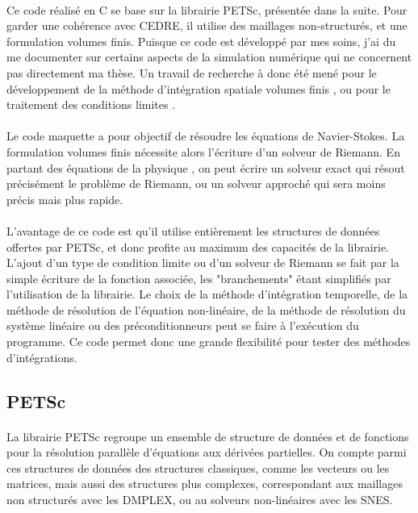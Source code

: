     \paragraph{}
    Ce code réalisé en C se base sur la librairie PETSc, présentée dans la suite.
    Pour garder une cohérence avec CEDRE, il utilise des maillages non-structurés, et une formulation volumes finis.
    Puisque ce code est développé par mes soins, j'ai du me documenter sur certains aspects de la simulation numérique qui ne concernent pas directement ma thèse.
    Un travail de recherche à donc été mené pour le développement de la méthode d'intégration spatiale volumes finis \cite{EymardGallouetHerbin2000}, ou pour le traitement des conditions limites \cite{PoinsotLele1992}.

    \paragraph{}
    Le code maquette a pour objectif de résoudre les équations de Navier-Stokes.
    La formulation volumes finis nécessite alors l'écriture d'un solveur de Riemann.
    En partant des équations de la physique \cite{Masatsuka2013}, on peut écrire un solveur exact \cite{GottliebGroth1988} qui résout précisément le problème de Riemann, ou un solveur approché \cite{Roe1981} qui sera moins précis mais plus rapide.

    \paragraph{}
    L'avantage de ce code est qu'il utilise entièrement les structures de données offertes par PETSc, et donc profite au maximum des capacités de la librairie.
    L'ajout d'un type de condition limite ou d'un solveur de Riemann se fait par la simple écriture de la fonction associée, les "branchements" étant simplifiés par l'utilisation de la librairie.
    Le choix de la méthode d'intégration temporelle, de la méthode de résolution de l'équation non-linéaire, de la méthode de résolution du système linéaire ou des préconditionneurs peut se faire à l'exécution du programme.
    Ce code permet donc une grande flexibilité pour tester des méthodes d’intégrations.

  \subsection{PETSc}

    \paragraph{}
    La librairie PETSc \cite{petsc-web-page, petsc-user-ref, petsc-efficient} regroupe un ensemble de structure de données et de fonctions pour la résolution parallèle d'équations aux dérivées partielles.
    On compte parmi ces structures de données des structures classiques, comme les vecteurs ou les matrices, mais aussi des structures plus complexes, correspondant aux maillages non structurés avec les DMPLEX, ou au solveurs non-linéaires avec les SNES.


